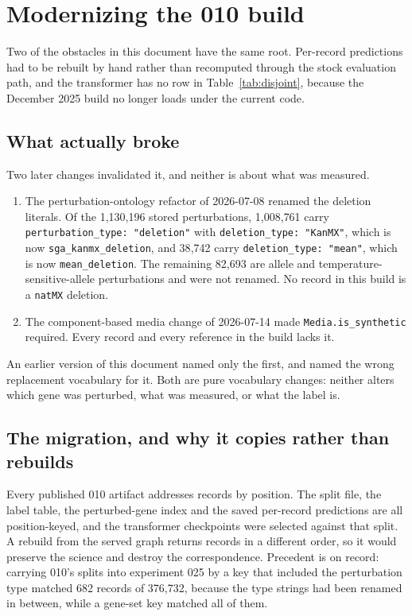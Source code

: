 
\section{Modernizing the 010 build}
\label{sec:modernize}

Two of the obstacles in this document have the same root. Per-record predictions
had to be rebuilt by hand rather than recomputed through the stock evaluation
path, and the transformer has no row in Table~\ref{tab:disjoint}, because the
December 2025 build no longer loads under the current code.

\subsection{What actually broke}

Two later changes invalidated it, and neither is about what was measured.

\begin{enumerate}
\item The perturbation-ontology refactor of 2026-07-08 renamed the deletion
  literals. Of the 1{,}130{,}196 stored perturbations, 1{,}008{,}761 carry
  \texttt{perturbation\_type: "deletion"} with \texttt{deletion\_type: "KanMX"},
  which is now \texttt{sga\_kanmx\_deletion}, and 38{,}742 carry
  \texttt{deletion\_type: "mean"}, which is now \texttt{mean\_deletion}. The
  remaining 82{,}693 are allele and temperature-sensitive-allele perturbations
  and were not renamed. No record in this build is a \texttt{natMX} deletion.
\item The component-based media change of 2026-07-14 made
  \texttt{Media.is\_synthetic} required. Every record and every reference in the
  build lacks it.
\end{enumerate}

An earlier version of this document named only the first, and named the wrong
replacement vocabulary for it. Both are pure vocabulary changes: neither alters
which gene was perturbed, what was measured, or what the label is.

\subsection{The migration, and why it copies rather than rebuilds}

Every published 010 artifact addresses records by position. The split file, the
label table, the perturbed-gene index and the saved per-record predictions are
all position-keyed, and the transformer checkpoints were selected against that
split. A rebuild from the served graph returns records in a different order, so
it would preserve the science and destroy the correspondence. Precedent is on
record: carrying 010's splits into experiment 025 by a key that included the
perturbation type matched 682 records of 376{,}732, because the type strings had
been renamed in between, while a gene-set key matched all of them.

